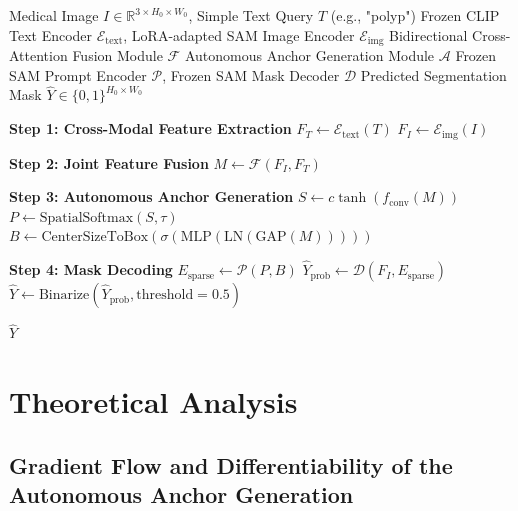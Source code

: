 \documentclass[onecolumn]{IEEEtran}
\numberwithin{equation}{section}
\theoremstyle{definition}
\theoremstyle{remark}
\begin{document}
\begin{algorithm}[htbp]
\caption{CMA-SAM End-to-End Inference Pipeline}
\label{alg:cma_sam_inference}
\begin{algorithmic}[1]
\Require Medical Image $I \in \mathbb{R}^{3 \times H_0 \times W_0}$, Simple Text Query $T$ (e.g., "polyp")
\Require Frozen CLIP Text Encoder $\mathcal{E}_{\text{text}}$, LoRA-adapted SAM Image Encoder $\mathcal{E}_{\text{img}}$
\Require Bidirectional Cross-Attention Fusion Module $\mathcal{F}$
\Require Autonomous Anchor Generation Module $\mathcal{A}$
\Require Frozen SAM Prompt Encoder $\mathcal{P}$, Frozen SAM Mask Decoder $\mathcal{D}$
\Ensure Predicted Segmentation Mask $\hat{Y} \in \{0, 1\}^{H_0 \times W_0}$

\State \textbf{Step 1: Cross-Modal Feature Extraction}
\State $F_T \gets \mathcal{E}_{\text{text}}(T)$ 
\State $F_I \gets \mathcal{E}_{\text{img}}(I)$ 

\State \textbf{Step 2: Joint Feature Fusion}
\State $M \gets \mathcal{F}(F_I, F_T)$ 

\State \textbf{Step 3: Autonomous Anchor Generation}
\State $S \gets c \tanh(f_{\text{conv}}(M))$ 
\State $P \gets \text{SpatialSoftmax}(S, \tau)$ 
\State $B \gets \text{CenterSizeToBox}(\sigma(\text{MLP}(\text{LN}(\text{GAP}(M)))))$ 

\State \textbf{Step 4: Mask Decoding}
\State $E_{\text{sparse}} \gets \mathcal{P}(P, B)$ 
\State $\hat{Y}_{\text{prob}} \gets \mathcal{D}(F_I, E_{\text{sparse}})$ 
\State $\hat{Y} \gets \text{Binarize}(\hat{Y}_{\text{prob}}, \text{threshold}=0.5)$ 

\State \Return $\hat{Y}$
\end{algorithmic}
\end{algorithm}
\section{Theoretical Analysis}

\subsection{Gradient Flow and Differentiability of the Autonomous Anchor Generation}
\end{document}
